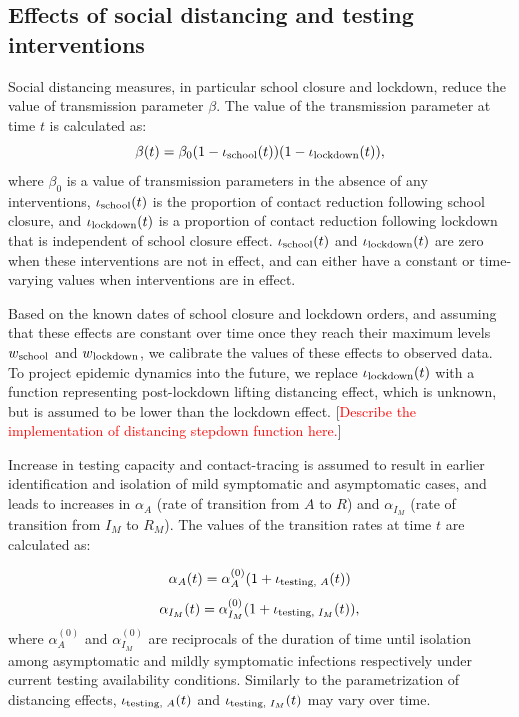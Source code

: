 \documentclass[11pt]{article}
\newcommand{\comments}[1]{[\textcolor{red}{#1}]}
\begin{document}


\subsection{Effects of social distancing and testing interventions} 
Social distancing measures, in particular school closure and lockdown, reduce the value of transmission parameter $\beta$. The value of the transmission parameter at time $t$ is calculated as:
\[ \beta(t) = \beta_0 (1 - \iota\textsubscript{school}(t) ) (1 - \iota\textsubscript{lockdown} (t) ), \]
where $\beta_0$ is a value of transmission parameters in the absence of any interventions, $\iota\textsubscript{school}(t)$ is the proportion of contact reduction following school closure, and $\iota\textsubscript{lockdown} (t)$ is a proportion of contact reduction following lockdown that is independent of school closure effect. $\iota\textsubscript{school}(t)$ and $\iota\textsubscript{lockdown} (t)$ are zero when these interventions are not in effect, and can either have a constant or time-varying values when interventions are in effect. 

Based on the known dates of school closure and lockdown orders, and assuming that these effects are constant over time once they reach their maximum levels $w\textsubscript{school}$ and $w\textsubscript{lockdown}$, we calibrate the values of these effects to observed data. To project epidemic dynamics into the future, we replace  $\iota\textsubscript{lockdown} (t)$ with a function representing post-lockdown lifting distancing effect, which is unknown, but is assumed to be lower than the lockdown effect. 
\comments{Describe the implementation of distancing stepdown function here.}

Increase in testing capacity and contact-tracing is assumed to result in earlier identification and isolation of mild symptomatic and asymptomatic cases, and leads to increases in $\alpha_A$ (rate of transition from $A$ to $R$) and $\alpha_{I_M}$ (rate of transition from $I_M$ to $R_M$). The values of the transition rates at time $t$ are calculated as:

\[ \alpha_A(t) = \alpha_A^{(0)} (1 + \iota\textsubscript{testing, $A$} (t)) \]
\[ \alpha_{I_M}(t) = \alpha_{I_M}^{(0)} (1 + \iota\textsubscript{testing, $I_M$} (t)), \]
where $\alpha_A^{(0)}$ and $\alpha_{I_M}^{(0)}$ are reciprocals of the duration of time until isolation among asymptomatic and mildly symptomatic infections respectively under current testing availability conditions. Similarly to the parametrization of distancing effects, $\iota\textsubscript{testing, $A$} (t)$ and $\iota\textsubscript{testing, $I_M$} (t)$ may vary over time. 
\end{document}
